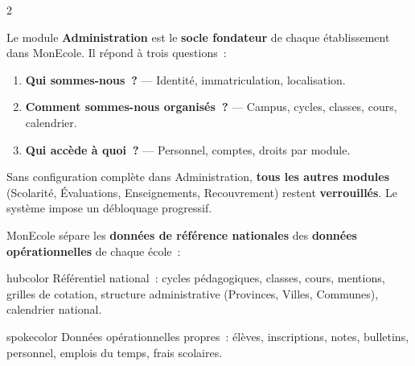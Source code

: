 
\begin{multicols}{2}


Le module \textbf{Administration} est le \textbf{socle fondateur} de chaque \'etablissement dans MonEcole. Il r\'epond \`a trois questions~:

\begin{enumerate}[label=\textcolor{indigo}{\arabic*.},itemsep=1pt,font=\scriptsize\bfseries]
  \item \textbf{Qui sommes-nous~?} --- Identit\'e, immatriculation, localisation.
  \item \textbf{Comment sommes-nous organis\'es~?} --- Campus, cycles, classes, cours, calendrier.
  \item \textbf{Qui acc\`ede \`a quoi~?} --- Personnel, comptes, droits par module.
\end{enumerate}

\begin{dangerbox}
\scriptsize Sans configuration compl\`ete dans Administration, \textbf{tous les autres modules} (Scolarit\'e, \'Evaluations, Enseignements, Recouvrement) restent \textbf{verrouill\'es}. Le syst\`eme impose un d\'ebloquage progressif.
\end{dangerbox}


MonEcole s\'epare les \textbf{donn\'ees de r\'ef\'erence nationales} des \textbf{donn\'ees op\'erationnelles} de chaque \'ecole~:

\begin{cbox}[title={\faDatabase\ Hub --- \texttt{countryStructure}}]{hubcolor}
\scriptsize R\'ef\'erentiel national~: cycles p\'edagogiques, classes, cours, mentions, grilles de cotation, structure administrative (Provinces, Villes, Communes), calendrier national.
\end{cbox}
\vspace{2pt}
\begin{cbox}[title={\faSchool\ Spoke --- \texttt{db\_monecole}}]{spokecolor}
\scriptsize Donn\'ees op\'erationnelles propres~: \'el\`eves, inscriptions, notes, bulletins, personnel, emplois du temps, frais scolaires.
\end{cbox}


\end{multicols}
